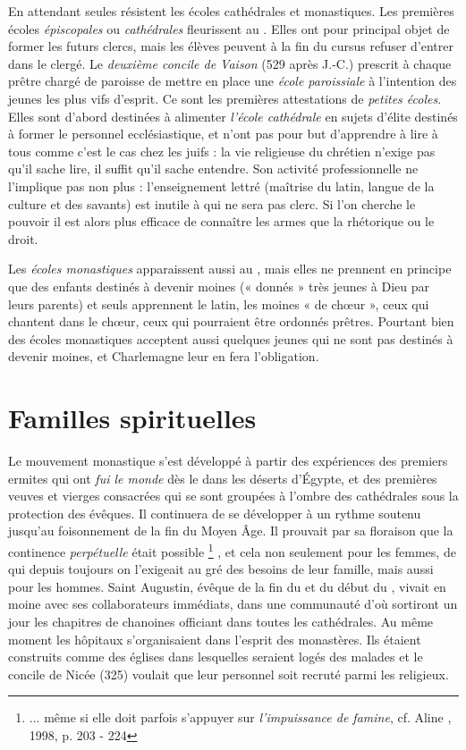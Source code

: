  En attendant seules résistent les écoles cathédrales et monastiques. Les premières écoles \emph{épiscopales} ou \emph{cathédrales} fleurissent au . Elles ont pour principal objet de former les futurs clercs, mais les élèves peuvent à la fin du cursus refuser d'entrer dans le clergé. Le \emph{deuxième concile de Vaison} (529 après J.-C.) prescrit à chaque prêtre chargé de paroisse de mettre en place une \emph{école paroissiale} à l'intention des jeunes les plus vifs d'esprit. Ce sont les premières attestations de \emph{petites écoles}. Elles sont d'abord destinées à alimenter \emph{l'école cathédrale} en sujets d'élite destinés à former le personnel ecclésiastique, et n'ont pas pour but d'apprendre à lire à tous comme c'est le cas chez les juifs : la vie religieuse du chrétien n'exige pas qu'il sache lire, il suffit qu'il sache entendre. Son activité professionnelle ne l'implique pas non plus : l'enseignement lettré (maîtrise du latin, langue de la culture et des savants) est inutile à qui ne sera pas clerc. Si l'on cherche le pouvoir il est alors plus efficace de connaître les armes que la rhétorique ou le droit. 
 
 Les \emph{écoles monastiques} apparaissent aussi au , mais elles ne prennent en principe que des enfants destinés à devenir moines (« donnés » très jeunes à Dieu par leurs parents) et seuls apprennent le latin, les moines « de chœur », ceux qui chantent dans le chœur, ceux qui pourraient être ordonnés prêtres. Pourtant bien des écoles monastiques acceptent aussi quelques jeunes qui ne sont pas destinés à devenir moines, et Charlemagne leur en fera l'obligation.
 
 


\section{Familles spirituelles}

 Le mouvement monastique s'est développé à partir des expériences des premiers ermites qui ont \emph{fui le monde} dès le  dans les déserts d'Égypte, et des premières veuves et vierges consacrées qui se sont groupées à l'ombre des cathédrales sous la protection des évêques. Il continuera de se développer à un rythme soutenu jusqu'au foisonnement de la fin du Moyen Âge. Il prouvait par sa floraison que la continence \emph{perpétuelle} était possible%
\footnote{... même si elle doit parfois s'appuyer sur \emph{l'impuissance de famine}, cf. Aline , 1998, p. 203 - 224}%
, et cela non seulement pour les femmes, de qui depuis toujours on l'exigeait au gré des besoins de leur famille, mais aussi pour les hommes. Saint Augustin, évêque de la fin du  et du début du , vivait en moine avec ses collaborateurs immédiats, dans une communauté d'où sortiront un jour les chapitres de chanoines officiant dans toutes les cathédrales. Au même moment les hôpitaux s'organisaient dans l'esprit des monastères. Ils étaient construits comme des églises dans lesquelles seraient logés des malades et le concile de Nicée (325) voulait que leur personnel soit recruté parmi les religieux.

